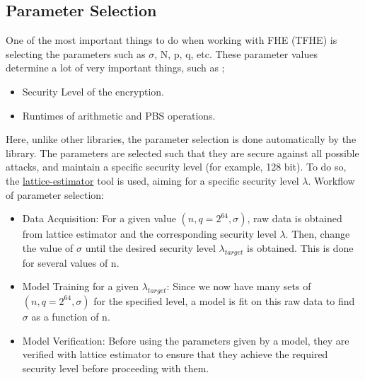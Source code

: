 \documentclass{report}
\begin{document}
\subsection{Parameter Selection}
One of the most important things to do when working with FHE (TFHE) is selecting the parameters such as $\sigma$, N, p, q, etc. These parameter values determine a lot of very important things, such as ;
\begin{itemize}
	\item Security Level of the encryption.
	\item Runtimes of arithmetic and PBS operations.
\end{itemize}
Here, unlike other libraries, the parameter selection is done automatically by the library. The parameters are selected such that they are secure against all possible attacks, and maintain a specific security level (for example, 128 bit). To do so, the \hyperref[ref:lattice-estimator]{lattice-estimator} tool is used, aiming for a specific security level $\lambda$.\newline\newline
Workflow of parameter selection:
\begin{itemize}
	\item Data Acquisition: For a given value $(n, q = 2^{64}, \sigma)$, raw data is obtained from lattice estimator and the corresponding security level $\lambda$. Then, change the value of $\sigma$ until the desired security level $\lambda_{target}$ is obtained. This is done for several values of n.
	\item Model Training for a given  $\lambda_{target}$: Since we now have many sets of $(n, q=2^{64}, \sigma)$ for the specified level, a model is fit on this raw data to find $\sigma$ as a function of n.
	\item Model Verification: Before using the parameters given by a model, they are verified with lattice estimator to ensure that they achieve the required security level before proceeding with them.
\end{itemize}
\end{document}
